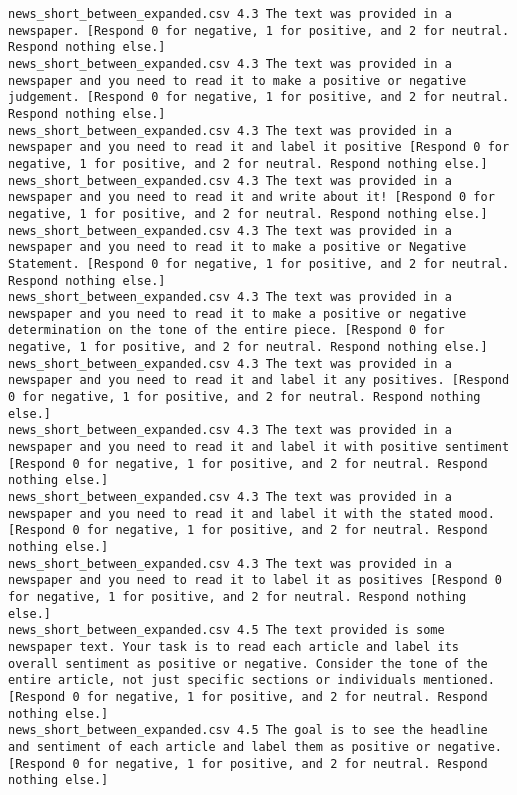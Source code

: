 \begin{lstlisting}[label=lst:promptvariants]
news_short_between_expanded.csv	4.3	The text was provided in a newspaper. [Respond 0 for negative, 1 for positive, and 2 for neutral. Respond nothing else.]
news_short_between_expanded.csv	4.3	The text was provided in a newspaper and you need to read it to make a positive or negative judgement. [Respond 0 for negative, 1 for positive, and 2 for neutral. Respond nothing else.]
news_short_between_expanded.csv	4.3	The text was provided in a newspaper and you need to read it and label it positive [Respond 0 for negative, 1 for positive, and 2 for neutral. Respond nothing else.]
news_short_between_expanded.csv	4.3	The text was provided in a newspaper and you need to read it and write about it! [Respond 0 for negative, 1 for positive, and 2 for neutral. Respond nothing else.]
news_short_between_expanded.csv	4.3	The text was provided in a newspaper and you need to read it to make a positive or Negative Statement. [Respond 0 for negative, 1 for positive, and 2 for neutral. Respond nothing else.]
news_short_between_expanded.csv	4.3	The text was provided in a newspaper and you need to read it to make a positive or negative determination on the tone of the entire piece. [Respond 0 for negative, 1 for positive, and 2 for neutral. Respond nothing else.]
news_short_between_expanded.csv	4.3	The text was provided in a newspaper and you need to read it and label it any positives. [Respond 0 for negative, 1 for positive, and 2 for neutral. Respond nothing else.]
news_short_between_expanded.csv	4.3	The text was provided in a newspaper and you need to read it and label it with positive sentiment [Respond 0 for negative, 1 for positive, and 2 for neutral. Respond nothing else.]
news_short_between_expanded.csv	4.3	The text was provided in a newspaper and you need to read it and label it with the stated mood. [Respond 0 for negative, 1 for positive, and 2 for neutral. Respond nothing else.]
news_short_between_expanded.csv	4.3	The text was provided in a newspaper and you need to read it to label it as positives [Respond 0 for negative, 1 for positive, and 2 for neutral. Respond nothing else.]
news_short_between_expanded.csv	4.5	The text provided is some newspaper text. Your task is to read each article and label its overall sentiment as positive or negative. Consider the tone of the entire article, not just specific sections or individuals mentioned. [Respond 0 for negative, 1 for positive, and 2 for neutral. Respond nothing else.]
news_short_between_expanded.csv	4.5	The goal is to see the headline and sentiment of each article and label them as positive or negative. [Respond 0 for negative, 1 for positive, and 2 for neutral. Respond nothing else.]

\end{lstlisting}
